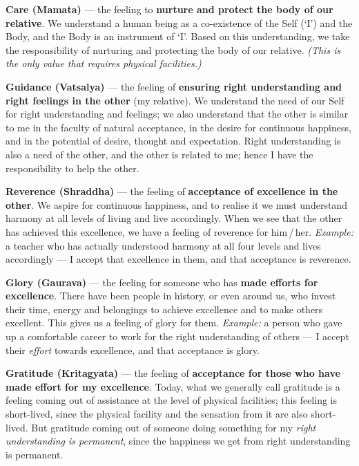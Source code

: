 
\ans
\begin{abul}
\item \textbf{Care (Mamata)} --- the feeling to \textbf{nurture and protect
      the body of our relative}. We understand a human being as a co-existence
      of the Self (`I') and the Body, and the Body is an instrument of `I'.
      Based on this understanding, we take the responsibility of nurturing and
      protecting the body of our relative. \emph{(This is the only value that
      requires physical facilities.)}
\item \textbf{Guidance (Vatsalya)} --- the feeling of \textbf{ensuring right
      understanding and right feelings in the other} (my relative). We
      understand the need of our Self for right understanding and feelings; we
      also understand that the other is similar to me in the faculty of
      natural acceptance, in the desire for continuous happiness, and in the
      potential of desire, thought and expectation. Right understanding is
      also a need of the other, and the other is related to me; hence I have
      the responsibility to help the other.
\item \textbf{Reverence (Shraddha)} --- the feeling of \textbf{acceptance of
      excellence in the other}. We aspire for continuous happiness, and to
      realise it we must understand harmony at all levels of living and live
      accordingly. When we see that the other has achieved this excellence, we
      have a feeling of reverence for him\,/\,her. \emph{Example:} a teacher
      who has actually understood harmony at all four levels and lives
      accordingly --- I accept that excellence in them, and that acceptance is
      reverence.
\item \textbf{Glory (Gaurava)} --- the feeling for someone who has \textbf{made
      efforts for excellence}. There have been people in history, or even
      around us, who invest their time, energy and belongings to achieve
      excellence and to make others excellent. This gives us a feeling of
      glory for them. \emph{Example:} a person who gave up a comfortable
      career to work for the right understanding of others --- I accept their
      \emph{effort} towards excellence, and that acceptance is glory.
\item \textbf{Gratitude (Kritagyata)} --- the feeling of \textbf{acceptance
      for those who have made effort for my excellence}. Today, what we
      generally call gratitude is a feeling coming out of assistance at the
      level of physical facilities; this feeling is short-lived, since the
      physical facility and the sensation from it are also short-lived. But
      gratitude coming out of someone doing something for my \emph{right
      understanding is permanent}, since the happiness we get from right
      understanding is permanent.
\end{abul}

